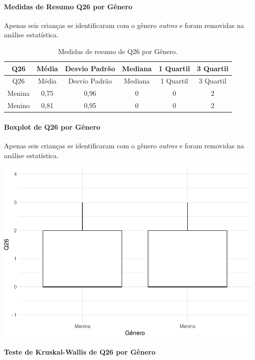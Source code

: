 \documentclass[]{article}
\let\oldparagraph\paragraph
\renewcommand{\paragraph}[1]{\oldparagraph{#1}\mbox{}}
\begin{document}
\hypertarget{medidas-de-resumo-q26-por-guxeanero}{%
\paragraph{Medidas de Resumo Q26 por Gênero}\label{medidas-de-resumo-q26-por-guxeanero}}

Apenas seis crianças se identificaram com o gênero \emph{outros} e foram removidas na análise estatística.

\begin{longtable}[]{@{}cccccc@{}}
\caption{\label{tab:unnamed-chunk-735}Medidas de resumo de Q26 por Gênero.}\tabularnewline
\toprule
Q26 & Média & Desvio Padrão & Mediana & 1 Quartil & 3 Quartil\tabularnewline
\midrule
\endfirsthead
\toprule
Q26 & Média & Desvio Padrão & Mediana & 1 Quartil & 3 Quartil\tabularnewline
\midrule
\endhead
Menina & 0,75 & 0,96 & 0 & 0 & 2\tabularnewline
Menino & 0,81 & 0,95 & 0 & 0 & 2\tabularnewline
\bottomrule
\end{longtable}

\hypertarget{boxplot-de-q26-por-guxeanero}{%
\paragraph{Boxplot de Q26 por Gênero}\label{boxplot-de-q26-por-guxeanero}}

Apenas seis crianças se identificaram com o gênero \emph{outros} e foram removidas na análise estatística.

\begin{center}\includegraphics[width=0.75\linewidth]{relatorio_covid19_files/figure-latex/unnamed-chunk-736-1} \end{center}

\hypertarget{teste-de-kruskal-wallis-de-q26-por-guxeanero}{%
\paragraph{Teste de Kruskal-Wallis de Q26 por Gênero}\label{teste-de-kruskal-wallis-de-q26-por-guxeanero}}
\end{document}
